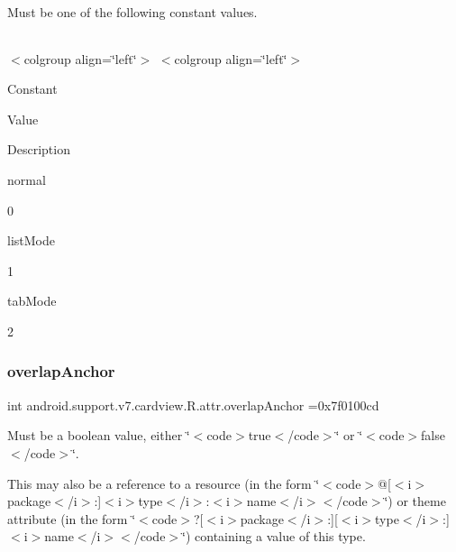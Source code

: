 Must be one of the following constant values.

\tabulinesep=1mm
\begin{longtabu} spread 0pt [c]{*{0}{|X[-1]}|}
\hline
\end{longtabu}
$<$colgroup align=\char`\"{}left\char`\"{}$>$ $<$colgroup align=\char`\"{}left\char`\"{}$>$ 

Constant

Value

Description 

{\ttfamily normal}

0

{\ttfamily list\+Mode}

1

{\ttfamily tab\+Mode}

2\mbox{\label{classandroid_1_1support_1_1v7_1_1cardview_1_1R_1_1attr_a45f20b43e5ada98f00d472a27f414032}} 
\subsubsection{\texorpdfstring{overlap\+Anchor}{overlapAnchor}}
{\footnotesize\ttfamily int android.\+support.\+v7.\+cardview.\+R.\+attr.\+overlap\+Anchor =0x7f0100cd\hspace{0.3cm}{\ttfamily [static]}}

Must be a boolean value, either \char`\"{}$<$code$>$true$<$/code$>$\char`\"{} or \char`\"{}$<$code$>$false$<$/code$>$\char`\"{}. 

This may also be a reference to a resource (in the form \char`\"{}$<$code$>$@\mbox{[}$<$i$>$package$<$/i$>$\+:\mbox{]}$<$i$>$type$<$/i$>$\+:$<$i$>$name$<$/i$>$$<$/code$>$\char`\"{}) or theme attribute (in the form \char`\"{}$<$code$>$?\mbox{[}$<$i$>$package$<$/i$>$\+:\mbox{]}\mbox{[}$<$i$>$type$<$/i$>$\+:\mbox{]}$<$i$>$name$<$/i$>$$<$/code$>$\char`\"{}) containing a value of this type. \mbox{\label{classandroid_1_1support_1_1v7_1_1cardview_1_1R_1_1attr_a07d1a86cd095b0bb58de34c228cbd699}} 
